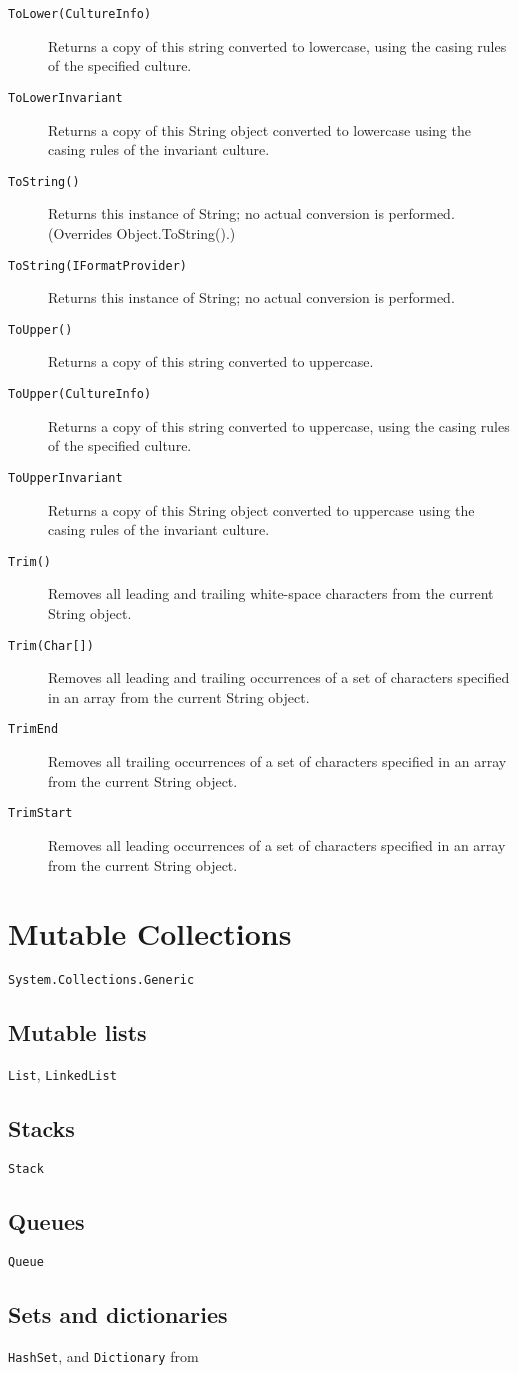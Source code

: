 \begin{description}
\item[\texttt{ToLower(CultureInfo)}] Returns a copy of this string converted to lowercase, using the casing rules of the specified culture.
\item[\texttt{ToLowerInvariant}] Returns a copy of this String object converted to lowercase using the casing rules of the invariant culture.
\item[\texttt{ToString()}] Returns this instance of String; no actual conversion is performed. (Overrides Object.ToString().)
\item[\texttt{ToString(IFormatProvider)}] Returns this instance of String; no actual conversion is performed.
\item[\texttt{ToUpper()}] Returns a copy of this string converted to uppercase.
\item[\texttt{ToUpper(CultureInfo)}] Returns a copy of this string converted to uppercase, using the casing rules of the specified culture.
\item[\texttt{ToUpperInvariant}] Returns a copy of this String object converted to uppercase using the casing rules of the invariant culture.
\item[\texttt{Trim()}] Removes all leading and trailing white-space characters from the current String object.
\item[\texttt{Trim(Char[])}] Removes all leading and trailing occurrences of a set of characters specified in an array from the current String object.
\item[\texttt{TrimEnd}] Removes all trailing occurrences of a set of characters specified in an array from the current String object.
\item[\texttt{TrimStart}] Removes all leading occurrences of a set of characters specified in an array from the current String object.
\end{description}

\section{Mutable Collections}
\verb|System.Collections.Generic|
\subsection{Mutable lists}
\verb|List|,  \verb|LinkedList|
\subsection{Stacks}
\verb|Stack|
\subsection{Queues}  
\verb|Queue|
\subsection{Sets and dictionaries}
\verb|HashSet|,  and \verb|Dictionary| from  

